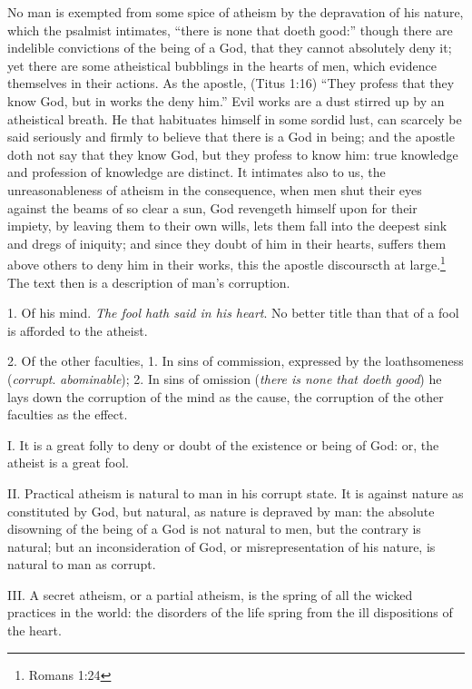 \documentclass[a5paper]{book}
\begin{document}
No man is exempted from some spice of atheism by the depravation of his nature,
    which the psalmist intimates, 
    ``there is none that doeth good:''
    though there are indelible convictions of the being of a God,
    that they cannot absolutely deny it; 
    yet there are some atheistical bubblings in the hearts of men, 
    which evidence themselves in their actions. 
As the apostle, (Titus 1:16) ``They profess that they know God, 
    but in works the deny him.'' 
Evil works are a dust stirred up by an atheistical breath. 
He that habituates himself in some sordid lust, 
    can scarcely be said seriously and firmly to believe 
    that there is a God in being; 
    and the apostle doth not say that they know God, 
    but they profess to know him: 
    true knowledge and profession of knowledge are distinct.
It intimates also to us, 
    the unreasonableness of atheism in the consequence, 
    when men shut their eyes against the beams of so clear a sun,
    God revengeth himself upon for their impiety, 
    by leaving them to their own wills, 
    lets them fall into the deepest sink and dregs of iniquity; 
    and since they doubt of him in their hearts, 
    suffers them above others to deny him in their works, 
    this the apostle discourscth at large.\footnote{Romans 1:24}
The text then is a description of man’s corruption.

1. Of his mind. \emph{The fool hath said in his heart}. 
    No better title than that of a fool is afforded to the atheist.

2. Of the other faculties, 
    1. In sins of commission, expressed by the loathsomeness
    (\emph{corrupt}. \emph{abominable}); 
    2. In sins of omission (\emph{there is none that doeth good})
    he lays down the corruption of the mind as the cause,
    the corruption of the other faculties as the effect.

I. It is a great folly to deny or doubt of the existence or being of God:
    or, the atheist is a great fool.

II. Practical atheism is natural to man in his corrupt state. 
It is against nature as constituted by God, but natural, 
    as nature is depraved by man: 
    the absolute disowning of the being of a God is not natural to men, 
    but the contrary is natural; 
    but an inconsideration of God, or misrepresentation of his nature, 
    is natural to man as corrupt.

III. A secret atheism, or a partial atheism, 
    is the spring of all the wicked practices in the world: 
    the disorders of the life spring from the ill dispositions of the heart.
\end{document}
